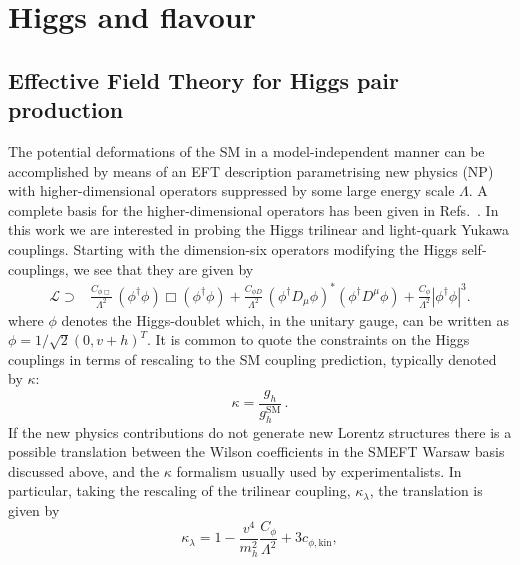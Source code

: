 
\chapter{ Higgs and flavour }\label{chap:flavhiggs}
\section{Effective Field Theory for Higgs pair production}
\label{sec:flavEFT}

The potential deformations of the SM in a model-independent manner can be accomplished by means of an EFT description parametrising new physics (NP) with higher-dimensional operators suppressed by some large energy scale $\Lambda$. A complete basis for the higher-dimensional operators has been given in Refs.~\cite{Grzadkowski:2010es,Contino:2013kra}. In this work we are interested in probing the Higgs trilinear and light-quark Yukawa couplings. 
Starting with the dimension-six operators modifying the Higgs self-couplings, we see that they are given by 
\begin{align}
	\mathcal{L} \supset &
	\frac{C_{\phi\Box}}{\Lambda^2}\,(\phi^\dagger \phi)\Box(\phi^\dagger \phi)+\frac{C_{\phi D}}{\Lambda^2}\,(\phi^\dagger D_\mu \phi)^*(\phi^\dagger D^\mu \phi)+\frac{C_\phi}{\Lambda^2}|\phi^{\dagger} \phi|^3.
	\label{eq:EFTop}
\end{align}
where $\phi$ denotes the Higgs-doublet which, in the unitary gauge, can be written as $\phi=1/\sqrt{2}(0,v+h)^T$. 
It is common to quote the constraints on the Higgs couplings in terms of rescaling to the SM coupling prediction, typically denoted by $\kappa$:
\begin{equation}
	\kappa = \frac{g_h}{g_h^{\mathrm{SM}}}\,.
\end{equation}
If the new physics contributions do not generate new Lorentz structures there is a possible translation between the Wilson coefficients in the SMEFT Warsaw basis discussed above, and the $\kappa$ formalism usually used by experimentalists. In particular, taking the rescaling of the trilinear coupling, $\kappa_\lambda$, the translation is given by
\begin{equation}
	\kappa_\lambda = 1-\frac{v^4}{m_h^2} \frac{C_\phi}{\Lambda^2}+3 c_{\phi,\mathrm{kin}},
\end{equation}
